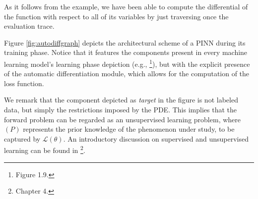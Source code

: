 \documentclass[12pt]{report} %
\begin{document}
As it follows from the example, we have been able to compute the differential of the function with respect to all of its variables by just traversing once the evaluation trace. 

Figure \ref{fig:autodiffgraph} depicts the architectural scheme of a PINN during its training phase. Notice that it features the components present in every machine learning model's learning phase depiction (e.g., \cite{chollet2021deep}\footnote{Figure 1.9.}), but with the explicit presence of the automatic differentiation module, which allows for the computation of the loss function. 

We remark that the component depicted as \textit{target} in the figure is not labeled data, but simply the restrictions imposed by the PDE. This implies that the forward problem can be regarded as an unsupervised learning problem, where $(P)$ represents the prior knowledge of the phenomenon under study, to be captured by $\mathcal{L}(\theta)$. An introductory discussion on supervised and unsupervised learning can be found in \cite{chollet2021deep}\footnote{Chapter 4.}.
\end{document}
